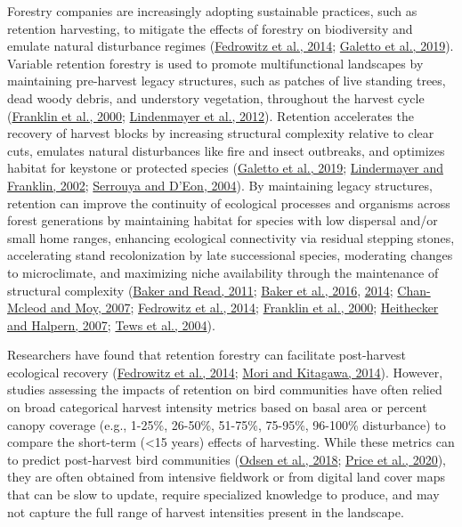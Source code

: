 \documentclass[
  12pt,
]{article}
\begin{document}
Forestry companies are increasingly adopting sustainable practices, such as retention harvesting, to mitigate the effects of forestry on biodiversity and emulate natural disturbance regimes (\protect\hyperlink{ref-FedrowitzKoricheva2014}{Fedrowitz et al., 2014}; \protect\hyperlink{ref-galettoVariableRetentionHarvesting2019}{Galetto et al., 2019}). Variable retention forestry is used to promote multifunctional landscapes by maintaining pre-harvest legacy structures, such as patches of live standing trees, dead woody debris, and understory vegetation, throughout the harvest cycle (\protect\hyperlink{ref-Franklin2000}{Franklin et al., 2000}; \protect\hyperlink{ref-Lindenmayer2012}{Lindenmayer et al., 2012}). Retention accelerates the recovery of harvest blocks by increasing structural complexity relative to clear cuts, emulates natural disturbances like fire and insect outbreaks, and optimizes habitat for keystone or protected species (\protect\hyperlink{ref-galettoVariableRetentionHarvesting2019}{Galetto et al., 2019}; \protect\hyperlink{ref-Lindermayer2002}{Lindermayer and Franklin, 2002}; \protect\hyperlink{ref-SerrouyaR.DEon2004}{Serrouya and D'Eon, 2004}). By maintaining legacy structures, retention can improve the continuity of ecological processes and organisms across forest generations by maintaining habitat for species with low dispersal and/or small home ranges, enhancing ecological connectivity via residual stepping stones, accelerating stand recolonization by late successional species, moderating changes to microclimate, and maximizing niche availability through the maintenance of structural complexity (\protect\hyperlink{ref-BakerRead2011}{Baker and Read, 2011}; \protect\hyperlink{ref-BakerJordan2016}{Baker et al., 2016}, \protect\hyperlink{ref-bakerMicroclimateSpaceTime2014}{2014}; \protect\hyperlink{ref-ChanMcleod2007}{Chan-Mcleod and Moy, 2007}; \protect\hyperlink{ref-FedrowitzKoricheva2014}{Fedrowitz et al., 2014}; \protect\hyperlink{ref-Franklin2000}{Franklin et al., 2000}; \protect\hyperlink{ref-heitheckerEdgerelatedGradientsMicroclimate2007}{Heithecker and Halpern, 2007}; \protect\hyperlink{ref-TewsBrose2004}{Tews et al., 2004}).

Researchers have found that retention forestry can facilitate post-harvest ecological recovery (\protect\hyperlink{ref-FedrowitzKoricheva2014}{Fedrowitz et al., 2014}; \protect\hyperlink{ref-moriRetentionForestryMajor2014}{Mori and Kitagawa, 2014}). However, studies assessing the impacts of retention on bird communities have often relied on broad categorical harvest intensity metrics based on basal area or percent canopy coverage (e.g., 1-25\%, 26-50\%, 51-75\%, 75-95\%, 96-100\% disturbance) to compare the short-term (\textless15 years) effects of harvesting. While these metrics can to predict post-harvest bird communities (\protect\hyperlink{ref-odsenBorealSongbirdsVariable2018}{Odsen et al., 2018}; \protect\hyperlink{ref-priceLongtermResponseForest2020}{Price et al., 2020}), they are often obtained from intensive fieldwork or from digital land cover maps that can be slow to update, require specialized knowledge to produce, and may not capture the full range of harvest intensities present in the landscape.
\end{document}
